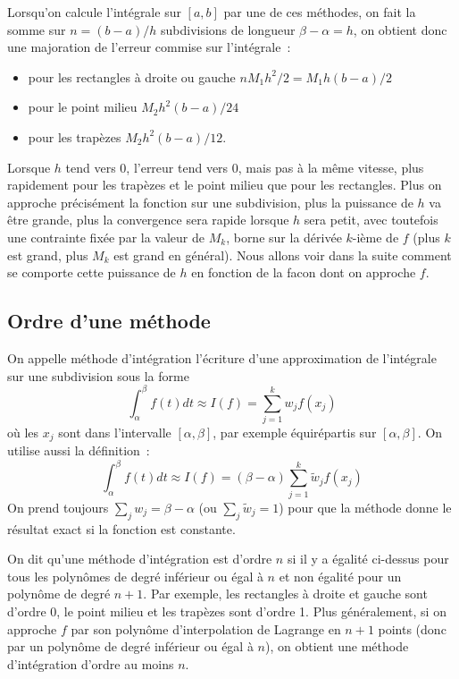 \documentclass[a4paper,11pt]{article}
\begin{document}
\begin{giacjshere}
Lorsqu'on calcule l'intégrale sur $[a,b]$ par une de ces méthodes,
on fait la somme sur $n=(b-a)/h$ subdivisions de longueur 
$\beta-\alpha=h$, on obtient
donc une majoration de l'erreur commise sur l'intégrale~:
\begin{itemize}
\item pour les rectangles à droite ou gauche $nM_1h^2/2=M_1 h (b-a)/2$
\item pour le point milieu $M_2 h^2 (b-a)/24$
\item pour les trapèzes $M_2h^2 (b-a)/12$.
\end{itemize}
Lorsque $h$ tend vers 0, l'erreur tend vers 0, mais pas à la même vitesse,
plus rapidement pour les trapèzes et le point milieu
que pour les rectangles. Plus on
approche précisément la fonction sur une subdivision, plus la
puissance de $h$ va être grande, plus la convergence sera rapide
lorsque $h$ sera petit, avec toutefois une contrainte fixée par la
valeur de $M_k$, borne sur la dérivée $k$-ième de $f$ (plus
$k$ est grand, plus $M_k$ est grand en général). Nous allons voir dans la suite
comment se comporte cette puissance de $h$ en fonction de la facon
dont on approche $f$.

\subsection{Ordre d'une méthode} 
On appelle méthode d'intégration l'écriture d'une approximation
de l'intégrale sur une subdivision sous la forme
\[ \int_{\alpha}^{\beta} f(t) dt \approx I(f)=\sum_{j=1}^k w_j f(x_j) \]
où les $x_j$ sont dans l'intervalle $[\alpha,\beta]$, par exemple équirépartis
sur $[\alpha,\beta]$. On utilise aussi la d\'efinition~:
\[ \int_{\alpha}^{\beta} f(t) dt \approx I(f)=
(\beta-\alpha)\sum_{j=1}^k \tilde{w}_j f(x_j) \]
On prend toujours $\sum_j w_j=\beta-\alpha$ (ou $\sum_j \tilde{w}_j=1$) pour
que la m\'ethode donne le r\'esultat exact si la fonction est constante.

On dit qu'une méthode d'intégration est d'ordre $n$ si il y a égalité
ci-dessus pour tous les polynômes de degré inférieur ou \'egal à $n$
et non \'egalit\'e pour un polyn\^ome de degr\'e $n+1$.
Par exemple, les rectangles à droite et gauche sont d'ordre 0, 
le point milieu et les trap\`ezes sont d'ordre 1. Plus
g\'en\'eralement, si on approche $f$ par son polyn\^ome
d'interpolation de Lagrange en $n+1$ points (donc par un polyn\^ome
de degr\'e inf\'erieur ou \'egal \`a $n$), on obtient une m\'ethode
d'int\'egration d'ordre au moins $n$.


\end{giacjshere}
\end{document}
